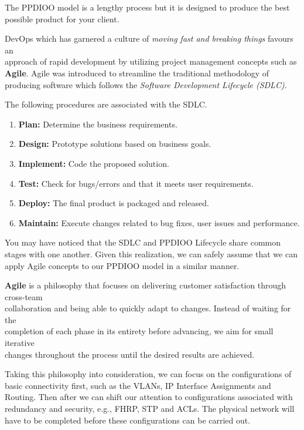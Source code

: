 \documentclass[12pt, letterpaper]{article}
\begin{document}
\smallskip

The PPDIOO model is a lengthy process but it is designed to produce the best possible product for your client.

\smallskip

DevOps which has garnered a culture of \textit{moving fast and breaking things} favours an \\ approach of rapid development by utilizing project management concepts such as \\ \textbf{Agile}. Agile was introduced to streamline the traditional methodology of producing software which follows the \textit{Software Development Lifecycle (SDLC)}.

The following procedures are associated with the SDLC.

\begin{enumerate}
\item \textbf{Plan:} Determine the business requirements.
\item \textbf{Design:} Prototype solutions based on business goals.
\item \textbf{Implement:} Code the proposed solution.
\item \textbf{Test:} Check for bugs/errors and that it meets user requirements.
\item \textbf{Deploy:} The final product is packaged and released.
\item \textbf{Maintain:} Execute changes related to bug fixes, user issues and performance.
\end{enumerate}

You may have noticed that the SDLC and PPDIOO Lifecycle share common stages with one another. Given this realization, we can safely assume that we can apply Agile concepts to our PPDIOO model in a similar manner.

\smallskip

\textbf{Agile} is a philosophy that focuses on delivering customer satisfaction through cross-team \\ collaboration and being able to quickly adapt to changes. Instead of waiting for the \\ completion of each phase in its entirety before advancing, we aim for small iterative \\ changes throughout the process until the desired results are achieved.

\smallskip

Taking this philosophy into consideration, we can focus on the configurations of basic connectivity first, such as the VLANs, IP Interface Assignments and Routing. Then after we can shift our attention to configurations associated with redundancy and security, e.g., FHRP, STP and ACLs. The physical network will have to be completed before these configurations can be carried out.
\end{document}
